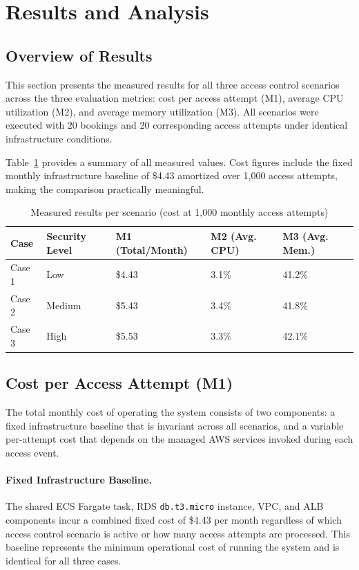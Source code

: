 \section{Results and Analysis}

\subsection{Overview of Results}

This section presents the measured results for all three access control scenarios across the three evaluation metrics: cost per access attempt (M1), average CPU utilization (M2), and average memory utilization (M3). All scenarios were executed with 20 bookings and 20 corresponding access attempts under identical infrastructure conditions.

Table~\ref{tab:results_overview} provides a summary of all measured values. Cost figures include the fixed monthly infrastructure baseline of \$4.43 amortized over 1{,}000 access attempts, making the comparison practically meaningful.

\begin{table}[H]
\centering
\caption{Measured results per scenario (cost at 1{,}000 monthly access attempts)}
\label{tab:results_overview}
\begin{tabular}{p{1.5cm}p{2.2cm}p{3.2cm}p{2.6cm}p{2.6cm}}
\hline
\textbf{Case} & \textbf{Security Level} & \textbf{M1 (Total/Month)} & \textbf{M2 (Avg. CPU)} & \textbf{M3 (Avg. Mem.)} \\
\hline
Case 1 & Low    & \$4.43 & 3.1\% & 41.2\% \\
Case 2 & Medium & \$5.43 & 3.4\% & 41.8\% \\
Case 3 & High   & \$5.53 & 3.3\% & 42.1\% \\
\hline
\end{tabular}
\end{table}

\subsection{Cost per Access Attempt (M1)}

The total monthly cost of operating the system consists of two components: a fixed infrastructure baseline that is invariant across all scenarios, and a variable per-attempt cost that depends on the managed AWS services invoked during each access event.

\paragraph{Fixed Infrastructure Baseline.}
The shared ECS Fargate task, RDS \texttt{db.t3.micro} instance, VPC, and ALB components incur a combined fixed cost of \$4.43 per month regardless of which access control scenario is active or how many access attempts are processed. This baseline represents the minimum operational cost of running the system and is identical for all three cases.


